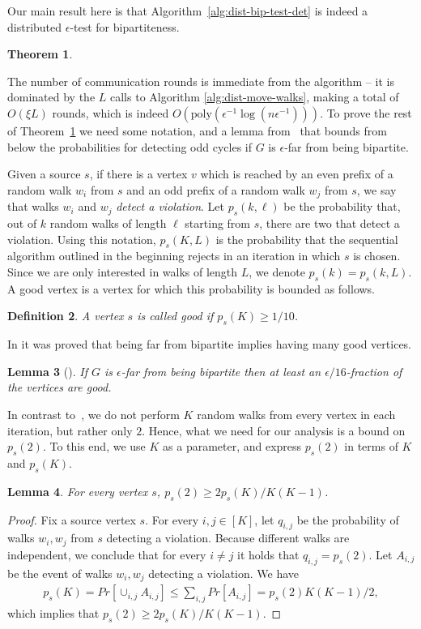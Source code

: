 \documentclass[11pt]{article}
\newtheorem{theorem}{Theorem}[section]
\newtheorem{lemma}[theorem]{Lemma}
\newtheorem{definition}[theorem]{Definition}
\newcommand{\poly}{\textrm{poly}}
\begin{document}
Our main result here is that Algorithm~\ref{alg:dist-bip-test-det} is indeed a distributed $\epsilon$-test for bipartiteness.

\begin{theorem}
\label{thm:bi}
\ThmBi
\end{theorem}

The number of communication rounds is immediate from the algorithm -- it is dominated by the $L$ calls to Algorithm \ref{alg:dist-move-walks}, making a total of $O(\xi L)$ rounds, which is indeed $O(\poly{(\epsilon^{-1} \log(n \epsilon^{-1}))})$. To prove the rest of Theorem~\ref{thm:bi} we need some notation, and a lemma from~\cite{GR99} that bounds from below the probabilities for detecting odd cycles if $G$ is $\epsilon$-far from being bipartite.

Given a source $s$, if there is a vertex $v$ which is reached by an even prefix of a random walk $w_i$ from $s$ and an odd prefix of a random walk $w_j$ from $s$, we say that walks $w_i$ and $w_j$ \emph{detect a violation}. Let $p_s(k,\ell)$ be the probability that, out of $k$ random walks of length $\ell$ starting from $s$, there are two that detect a violation.
Using this notation, $p_s(K,L)$ is the probability that the sequential algorithm outlined in the beginning rejects in an iteration in which $s$ is chosen. Since we are only interested in walks of length $L$, we denote $p_s(k)=p_s(k,L)$. A good vertex is a vertex for which this probability is bounded as follows.
\begin{definition}
\label{def:good}
A vertex $s$ is called \emph{good} if $p_s(K) \geq 1/10$.
\end{definition}

In \cite{GR99} it was proved that being far from bipartite implies having many good vertices.

\begin{lemma}[\cite{GR99}]
\label{lemma:GR}
If $G$ is $\epsilon$-far from being bipartite then at least an $\epsilon/16$-fraction of the vertices are good.
\end{lemma}

In contrast to~\cite{GR99}, we do not perform $K$ random walks from every vertex in each iteration, but rather only $2$. Hence, what we need for our analysis is a bound on $p_s(2)$. To this end, we use $K$ as a parameter, and express $p_s(2)$ in terms of $K$ and $p_s(K)$.

\begin{lemma}
\label{lemma:ps2}
For every vertex $s$, $p_s(2) \geq 2p_s(K)/K(K-1)$.
\end{lemma}
\begin{proof}
Fix a source vertex $s$. For every $i,j \in [K]$, let $q_{i,j}$ be the probability of walks $w_i,w_j$ from $s$ detecting a violation. Because different walks are independent, we conclude that for every $i \neq j$ it holds that $q_{i,j}=p_s(2)$. Let $A_{i,j}$ be the event of walks $w_i,w_j$ detecting a violation. We have
\begin{align*}
p_s(K) = Pr[\cup_{i,j}A_{i,j}] \leq \sum_{i,j} Pr[A_{i,j}] = p_s(2)K(K-1)/2,
\end{align*}
which implies that $p_s(2) \geq 2p_s(K)/K(K-1)$.
\end{proof}
\end{document}
